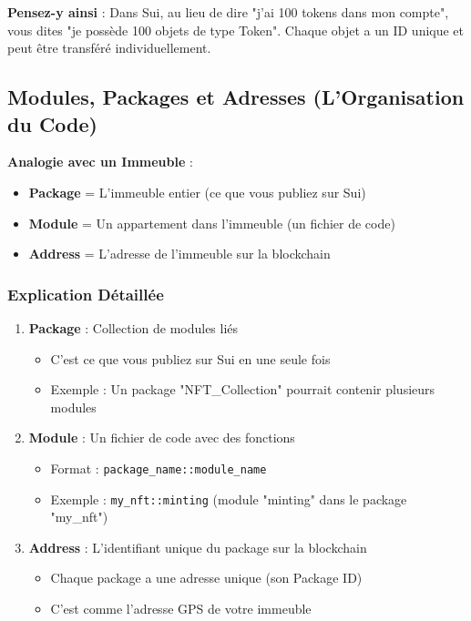 \documentclass[11pt]{article}
\begin{document}
\begin{noteBox}
\textbf{Pensez-y ainsi} : Dans Sui, au lieu de dire "j'ai 100 tokens dans mon compte", vous dites "je possède 100 objets de type Token". Chaque objet a un ID unique et peut être transféré individuellement.
\end{noteBox}

\subsection{Modules, Packages et Adresses (L'Organisation du Code)}

\begin{explainBox}
\textbf{Analogie avec un Immeuble} :
\begin{itemize}
  \item \textbf{Package} = L'immeuble entier (ce que vous publiez sur Sui)
  \item \textbf{Module} = Un appartement dans l'immeuble (un fichier de code)
  \item \textbf{Address} = L'adresse de l'immeuble sur la blockchain
\end{itemize}
\end{explainBox}

\subsubsection{Explication Détaillée}

\begin{enumerate}
  \item \textbf{Package} : Collection de modules liés
  \begin{itemize}
    \item C'est ce que vous publiez sur Sui en une seule fois
    \item Exemple : Un package "NFT\_Collection" pourrait contenir plusieurs modules
  \end{itemize}
  
  \item \textbf{Module} : Un fichier de code avec des fonctions
  \begin{itemize}
    \item Format : \texttt{package\_name::module\_name}
    \item Exemple : \texttt{my\_nft::minting} (module "minting" dans le package "my\_nft")
  \end{itemize}
  
  \item \textbf{Address} : L'identifiant unique du package sur la blockchain
  \begin{itemize}
    \item Chaque package a une adresse unique (son Package ID)
    \item C'est comme l'adresse GPS de votre immeuble
  \end{itemize}
\end{enumerate}
\end{document}

